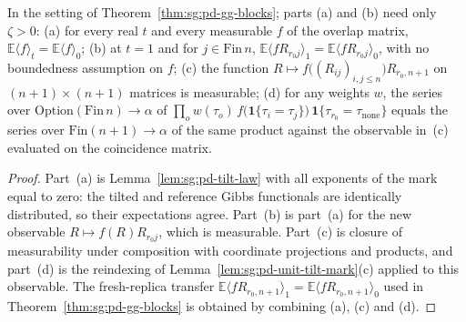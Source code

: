 \begin{lemma}\label{lem:sg:pd-overlap-tilt}
  \leanok
In the setting of Theorem~\ref{thm:sg:pd-gg-blocks}; parts (a) and (b) need only $\zeta>0$:
(a) for every real $t$ and every measurable $f$ of the overlap matrix, $\mathbb E\langle f\rangle_t=\mathbb E\langle f\rangle_0$;
(b) at $t=1$ and for $j\in\mathrm{Fin}\,n$, $\mathbb E\langle fR_{r_0j}\rangle_1=\mathbb E\langle fR_{r_0j}\rangle_0$, with no boundedness assumption on $f$;
(c) the function $R\mapsto f\bigl((R_{ij})_{i,j\le n}\bigr)R_{r_0,n+1}$ on $(n+1)\times(n+1)$ matrices is measurable;
(d) for any weights $w$, the series over $\mathrm{Option}(\mathrm{Fin}\,n)\to\alpha$ of $\prod_ow(\tau_o)\,f\bigl(\mathbf 1\{\tau_i=\tau_j\}\bigr)\,\mathbf 1\{\tau_{r_0}=\tau_{\mathrm{none}}\}$ equals the series over $\mathrm{Fin}(n+1)\to\alpha$ of the same product against the observable in~(c) evaluated on the coincidence matrix.
\end{lemma}
\begin{proof}
  \leanok
Part~(a) is Lemma~\ref{lem:sg:pd-tilt-law} with all exponents of the mark equal to zero: the tilted and reference Gibbs functionals are identically distributed, so their expectations agree. Part~(b) is part~(a) for the new observable $R\mapsto f(R)R_{r_0j}$, which is measurable. Part~(c) is closure of measurability under composition with coordinate projections and products, and part~(d) is the reindexing of Lemma~\ref{lem:sg:pd-unit-tilt-mark}(c) applied to this observable. The fresh-replica transfer $\mathbb E\langle fR_{r_0,n+1}\rangle_1=\mathbb E\langle fR_{r_0,n+1}\rangle_0$ used in Theorem~\ref{thm:sg:pd-gg-blocks} is obtained by combining (a), (c) and (d).
\end{proof}

